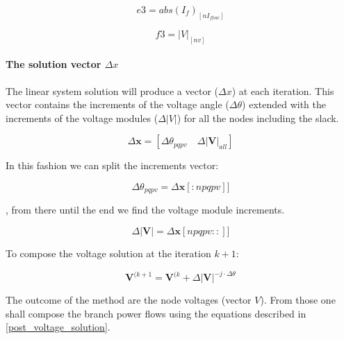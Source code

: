 \documentclass[nols,a4paper,twoside,notoc,fleqn]{tufte-book}
\begin{document}

\begin{equation}
e3 = abs\left(I_f\right)_{[nI_{flow}]}
\end{equation}


\begin{equation}
f3 = |V|_{[nv]}
\end{equation}



\paragraph{The solution vector $\Delta x$}

The linear system solution will produce a vector ($\Delta x$) at each iteration. This vector contains the increments of the voltage angle ($\Delta \theta$) extended with the increments of the voltage modules ($\Delta |V|$) for all the nodes including the slack.

\begin{equation}
\Delta \textbf{x} = [ \Delta \theta_{pqpv} \quad \Delta|\textbf{V}|_{all} ]
\end{equation}

In this fashion we can split the increments vector:

\begin{equation}
\Delta \theta_{pqpv} = \Delta \textbf{x}[:npqpv]]
\end{equation}

, from there until the end we find the voltage module increments.

\begin{equation}
\Delta |\textbf{V}| = \Delta \textbf{x}[npqpv::]]
\end{equation}

To compose the voltage solution at the iteration $k+1$:

\begin{equation}
\textbf{V}^{(k+1} =  \textbf{V}^{(k} + \Delta |\textbf{V}| ^{-j \cdot \Delta \theta}
\end{equation}

The outcome of the method are the node voltages (vector $V$). From those one shall compose the branch power flows
using the equations described in \ref{post_voltage_solution}.
\end{document}
